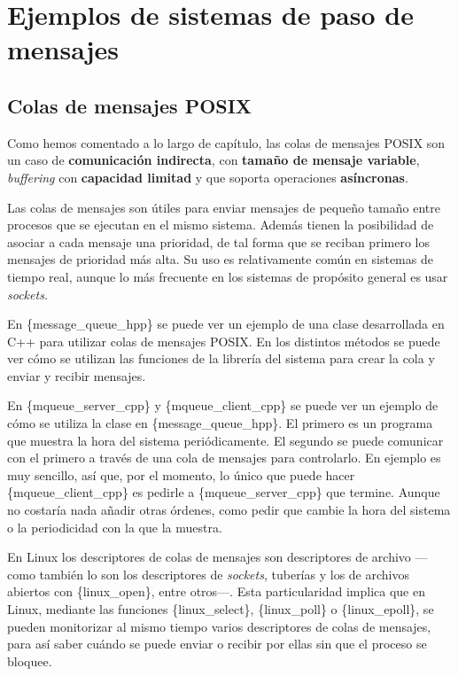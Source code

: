 \section{Ejemplos de sistemas de paso de
mensajes}\label{_ejemplos_de_sistemas_de_paso_de_mensajes}

\subsection{Colas de mensajes POSIX}\label{_colas_de_mensajes_posix}

Como hemos comentado a lo largo de capítulo, las colas de mensajes POSIX
son un caso de \textbf{comunicación indirecta}, con \textbf{tamaño de
mensaje variable}, \emph{buffering} con \textbf{capacidad limitad} y que
soporta operaciones \textbf{asíncronas}.

Las colas de mensajes son útiles para enviar mensajes de pequeño tamaño
entre procesos que se ejecutan en el mismo sistema. Además tienen la
posibilidad de asociar a cada mensaje una prioridad, de tal forma que se
reciban primero los mensajes de prioridad más alta. Su uso es
relativamente común en sistemas de tiempo real, aunque lo más frecuente
en los sistemas de propósito general es usar \emph{sockets}.

En \{message\_queue\_hpp\} se puede ver un ejemplo de una clase
desarrollada en C++ para utilizar colas de mensajes POSIX. En los
distintos métodos se puede ver cómo se utilizan las funciones de la
librería del sistema para crear la cola y enviar y recibir mensajes.

En \{mqueue\_server\_cpp\} y \{mqueue\_client\_cpp\} se puede ver un
ejemplo de cómo se utiliza la clase en \{message\_queue\_hpp\}. El
primero es un programa que muestra la hora del sistema periódicamente.
El segundo se puede comunicar con el primero a través de una cola de
mensajes para controlarlo. En ejemplo es muy sencillo, así que, por el
momento, lo único que puede hacer \{mqueue\_client\_cpp\} es pedirle a
\{mqueue\_server\_cpp\} que termine. Aunque no costaría nada añadir
otras órdenes, como pedir que cambie la hora del sistema o la
periodicidad con la que la muestra.

En Linux los descriptores de colas de mensajes son descriptores de
archivo ---como también lo son los descriptores de \emph{sockets},
tuberías y los de archivos abiertos con \{linux\_open\}, entre otros---.
Esta particularidad implica que en Linux, mediante las funciones
\{linux\_select\}, \{linux\_poll\} o \{linux\_epoll\}, se pueden
monitorizar al mismo tiempo varios descriptores de colas de mensajes,
para así saber cuándo se puede enviar o recibir por ellas sin que el
proceso se bloquee.

